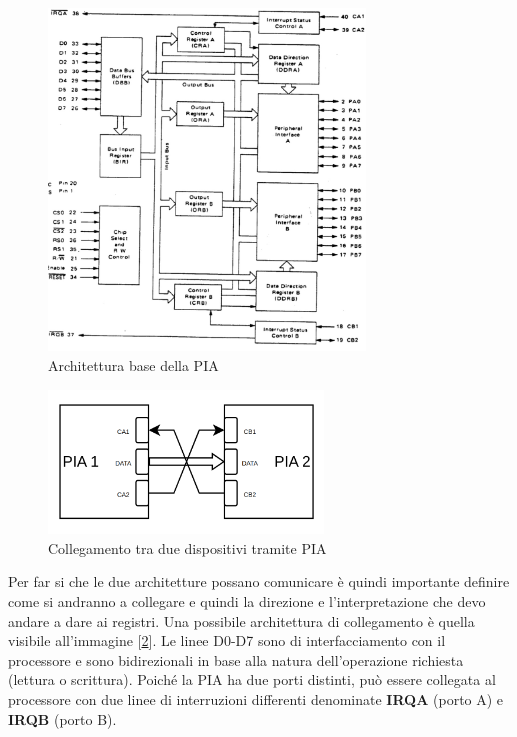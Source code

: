 \begin{figure}
    \centering
    \includegraphics[width=0.75\textwidth]{img/PIA-SCHEME.jpg}
    \caption{Architettura base della PIA}\label{img:PIA}
\end{figure}

\begin{figure}
    \centering
    \includegraphics[width=0.65\textwidth]{img/PIA-CON.png}
    \caption{Collegamento tra due dispositivi tramite PIA}\label{img:PIA-CON}
\end{figure}

Per far si che le due architetture possano comunicare è quindi importante definire come si andranno a collegare e quindi la direzione e l'interpretazione che devo andare a dare ai registri. Una possibile architettura di collegamento è quella visibile all'immagine [\ref{img:PIA-CON}].
Le linee D0-D7 sono di interfacciamento con il processore e sono bidirezionali in base alla natura dell'operazione richiesta (lettura o scrittura). 
Poiché la PIA ha due porti distinti, può essere collegata al processore con due linee di interruzioni differenti denominate \textbf{IRQA} (porto A) e \textbf{IRQB} (porto B).  

